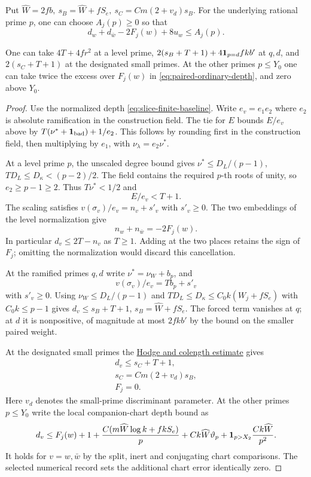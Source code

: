 \begin{lemma}
Put \(\widehat W=2fb,\ s_B=\widehat W+fS_e,\ s_C=Cm(2+v_d)s_B\).
For the underlying rational prime \(p\), one can choose \(A_j(p)\ge0\) so that
\[
 d_w+d_{\bar w}-2F_j(w)+8u_w\le A_j(p).
\]

One can take \(4T+4fr^2\) at a level prime,
\(2(s_B+T+1)+4{\bf1}_{p=d}fkb'\) at \(q,d\), and
\(2(s_C+T+1)\) at the designated small primes. At the other
primes \(p\le Y_0\) one can take twice the excess over \(F_j(w)\)
in \eqref{eq:paired-ordinary-depth}, and zero above \(Y_0\).
\end{lemma}
\begin{proof}
Use the normalized depth \eqref{eq:slice-finite-baseline}.
Write \(e_v=e_1 e_2\) where \(e_2\) is
absolute ramification in the construction field.
The tie for \(E\) bounds \(E/e_v\) above by
\(T(\nu^*+{\bf1}_{\rm bad})+1/e_2\). This follows by
rounding first in the construction field, then multiplying
by \(e_1\), with \(\nu_\lambda=e_2\nu^*\).

At a level prime \(p\), the unscaled degree bound gives
\(\nu^*\le D_L/(p-1)\), \(TD_L\le D_\kappa<(p-2)/2\).
The field contains the required \(p\)-th roots of unity, so
\(e_2\ge p-1\ge2\). Thus \(T\nu^*<1/2\) and 
\[
  E/e_v< T+1.
\]
The scaling satisfies \(v(\sigma_v)/e_v=n_v+s'_v\)
with \(s'_v\ge0\). The two embeddings of the level
normalization give 
\[
  n_w+n_{\bar w}=-2F_j(w).
\]
 In particular
\(d_v\le2T-n_v\) as \(T\ge1\). Adding at the two places
retains the sign of \(F_j\); omitting the normalization would
discard this cancellation.

At the ramified primes \(q,d\) write
\(\nu^*=\nu_W+b_p\), and 
\[
  v(\sigma_v)/e_v=T b_p+s'_v
\]
with \(s'_v\ge0\). Using \(\nu_W\le D_L/(p-1)\) and
\(TD_L\le D_\kappa\le C_0 k (W_j+fS_e)\) with \(C_0k\le p-1\)
gives \(d_v\le s_B+T+1\), \(s_B=\widehat W+fS_e\). The forced
term vanishes at \(q\); at \(d\) it is nonpositive, of magnitude
at most \(2fkb'\) by the bound on the smaller paired weight.

At the designated small primes the
\hyperref[par:unscaled-light-depth]{Hodge and colength estimate} gives
\[
 \begin{gathered}
 d_v\le s_C+T+1, \\ s_C=Cm(2+v_d)s_B, \\ F_j=0.
\end{gathered}
\] Here \(v_d\) denotes the small-prime
discriminant parameter. At the other primes \(p\le Y_0\)
write the local companion-chart depth bound as
\begin{equation}\label{eq:paired-ordinary-depth}
 d_v\le F_j(w)+1+
 \frac{C(m\widehat W\log k+fkS_e)}p+Ck\widehat W\vartheta_p+
 {\bf1}_{p>X_2}\frac{Ck\widehat W}{p^2}.
\end{equation}
It holds for \(v=w,\bar w\) by the split, inert and
conjugating chart comparisons. The selected numerical record
sets the additional chart error identically zero.


\end{proof}
